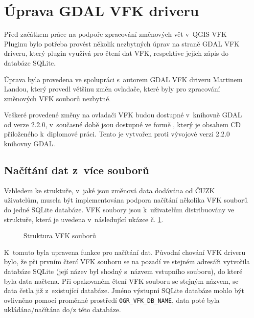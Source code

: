 \documentclass[a4paper,12pt,oneside]{book}
\begin{document}
\clearpage
\section{Úprava GDAL VFK driveru}
\label{l_uprava_gdal}
Před začátkem práce na podpoře zpracování změnových vět v~QGIS VFK Pluginu bylo potřeba provést několik nezbytných úprav na straně GDAL VFK driveru, který plugin využívá pro čtení dat VFK, respektive jejich zápis do databáze SQLite.

Úprava byla provedena ve spolupráci s~autorem GDAL VFK driveru Martinem Landou, který provedl většinu změn ovladače, které byly pro zpracování změnových VFK souborů nezbytné. 

Veškeré provedené změny na ovladači VFK budou dostupné v~knihovně GDAL od verze 2.2.0, v~současné době jsou dostupné ve formě , který je obsahem CD přiloženého k~diplomové práci. Tento  je vytvořen proti vývojové verzi 2.2.0 knihovny GDAL.

\subsection{Načítání dat z~více souborů}
Vzhledem ke struktuře, v~jaké jsou změnová data dodávána od ČUZK uživatelům, musela být implementována podpora načítání několika VFK souborů do jedné SQLite databáze. VFK soubory jsou k~uživatelům distribuovány ve struktuře, která je uvedena v~následující ukázce č. \ref{l_struktura_sireni_vfk}.

\begin{figure}[htb]
\centering
\begin{minipage}{0.9\textwidth}
\end{minipage}
\caption{Struktura VFK souborů}
\label{l_struktura_sireni_vfk}
\end{figure}

K~tomuto byla upravena funkce pro načítání dat. Původní chování VFK driveru bylo, že při prvním čtení VFK souboru se na pozadí ve stejném adresáři vytvořila databáze SQLite (její název byl shodný s~názvem vstupního souboru), do které byla data načtena. Při opakovaném čtení VFK souboru se stejným názvem, se data četla již z~existující databáze. Jméno výstupní SQLite databáze mohlo být ovlivněno pomocí proměnné prostředí \texttt{OGR\_VFK\_DB\_NAME}, data poté byla ukládána/načítána do/z této databáze. 
\end{document}
